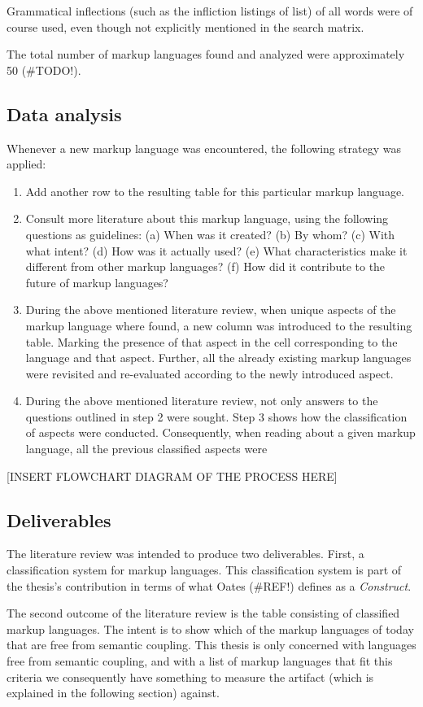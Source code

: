 \documentclass{scrreprt}
\begin{document}
Grammatical inflections (such as the infliction listings of list) of all words were of course used, even though not explicitly mentioned in the search matrix.

The total number of markup languages found and analyzed were approximately 50 (\#TODO!).


\subsection{Data analysis}
Whenever a new markup language was encountered, the following strategy was applied:

\begin{enumerate}
\item Add another row to the resulting table for this particular markup language.
\item Consult more literature about this markup language, using the following questions as guidelines: (a) When was it created? (b) By whom? (c) With what intent? (d) How was it actually used? (e) What characteristics make it different from other markup languages? (f) How did it contribute to the future of markup languages?
\item During the above mentioned literature review, when unique aspects of the markup language where found, a new column was introduced to the resulting table. Marking the presence of that aspect in the cell corresponding to the language and that aspect. Further, all the already existing markup languages were revisited and re-evaluated according to the newly introduced aspect.
\item During the above mentioned literature review, not only answers to the questions outlined in step 2 were sought. Step 3 shows how the classification of aspects were conducted. Consequently, when reading about a given markup language, all the previous classified aspects were 
\end{enumerate}

[INSERT FLOWCHART DIAGRAM OF THE PROCESS HERE]


\subsection{Deliverables}
The literature review was intended to produce two deliverables. First, a classification system for markup languages. This classification system is part of the thesis's contribution in terms of what Oates (\#REF!) defines as a \emph{Construct}.

The second outcome of the literature review is the table consisting of classified markup languages. The intent is to show which of the markup languages of today that are free from semantic coupling. This thesis is only concerned with languages free from semantic coupling, and with a list of markup languages that fit this criteria we consequently have something to measure the artifact (which is explained in the following section) against.
\end{document}
